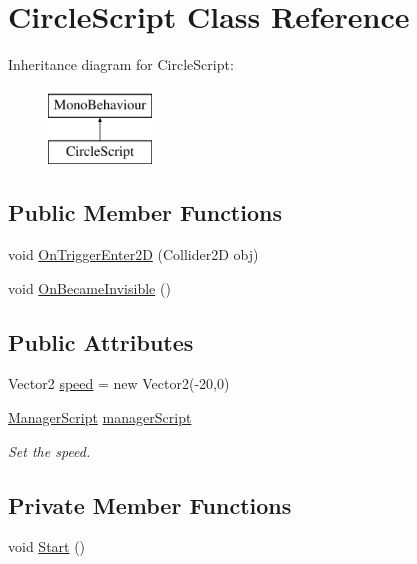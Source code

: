 \hypertarget{class_circle_script}{\section{Circle\-Script Class Reference}
\label{class_circle_script}
}
Inheritance diagram for Circle\-Script\-:\begin{figure}[H]
\begin{center}
\leavevmode
\includegraphics[height=2.000000cm]{class_circle_script}
\end{center}
\end{figure}
\subsection*{Public Member Functions}
\begin{DoxyCompactItemize}
\item 
void \hyperlink{class_circle_script_a1d1b1b39ff03be1b31fa855760e2f704}{On\-Trigger\-Enter2\-D} (Collider2\-D obj)
\item 
void \hyperlink{class_circle_script_ac2f21c8ce3074c924eece8d688a5a87f}{On\-Became\-Invisible} ()
\end{DoxyCompactItemize}
\subsection*{Public Attributes}
\begin{DoxyCompactItemize}
\item 
Vector2 \hyperlink{class_circle_script_a4b8a0a38630b44c7e210b8b6be2549c2}{speed} = new Vector2(-\/20,0)
\item 
\hyperlink{class_manager_script}{Manager\-Script} \hyperlink{class_circle_script_ac766a11165e1111c478837fae3df9c19}{manager\-Script}
\begin{DoxyCompactList}\small\item\em Set the speed. \end{DoxyCompactList}\end{DoxyCompactItemize}
\subsection*{Private Member Functions}
\begin{DoxyCompactItemize}
\item 
void \hyperlink{class_circle_script_a79d3a6c4e26f7235eff64bcb1bb8af99}{Start} ()
\end{DoxyCompactItemize}


